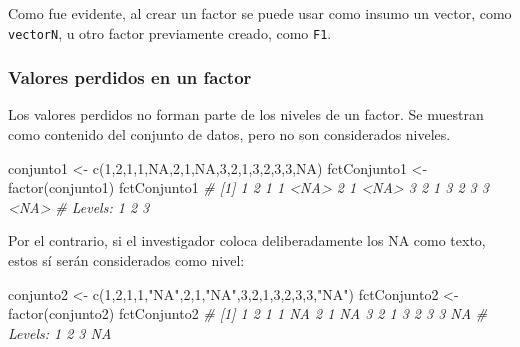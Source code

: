 \documentclass[
]{article}
\newenvironment{Shaded}{\begin{snugshade}}{\end{snugshade}}
\newcommand{\CommentTok}[1]{\textcolor[rgb]{0.56,0.35,0.01}{\textit{#1}}}
\newcommand{\ConstantTok}[1]{\textcolor[rgb]{0.00,0.00,0.00}{#1}}
\newcommand{\DecValTok}[1]{\textcolor[rgb]{0.00,0.00,0.81}{#1}}
\newcommand{\FunctionTok}[1]{\textcolor[rgb]{0.00,0.00,0.00}{#1}}
\newcommand{\NormalTok}[1]{#1}
\newcommand{\OtherTok}[1]{\textcolor[rgb]{0.56,0.35,0.01}{#1}}
\newcommand{\StringTok}[1]{\textcolor[rgb]{0.31,0.60,0.02}{#1}}
\theoremstyle{definition}
\theoremstyle{definition}
\theoremstyle{definition}
\theoremstyle{definition}
\theoremstyle{remark}
\begin{document}
Como fue evidente, al crear un factor se puede usar como insumo un vector, como \texttt{vectorN}, u otro factor previamente creado, como \texttt{F1}.

\hypertarget{valores-perdidos-en-un-factor}{%
\subsubsection{Valores perdidos en un factor}\label{valores-perdidos-en-un-factor}}

Los valores perdidos no forman parte de los niveles de un factor. Se muestran como contenido del conjunto de datos, pero no son considerados niveles.

\begin{Shaded}
\begin{Highlighting}[]
\NormalTok{conjunto1 }\OtherTok{\textless{}{-}} \FunctionTok{c}\NormalTok{(}\DecValTok{1}\NormalTok{,}\DecValTok{2}\NormalTok{,}\DecValTok{1}\NormalTok{,}\DecValTok{1}\NormalTok{,}\ConstantTok{NA}\NormalTok{,}\DecValTok{2}\NormalTok{,}\DecValTok{1}\NormalTok{,}\ConstantTok{NA}\NormalTok{,}\DecValTok{3}\NormalTok{,}\DecValTok{2}\NormalTok{,}\DecValTok{1}\NormalTok{,}\DecValTok{3}\NormalTok{,}\DecValTok{2}\NormalTok{,}\DecValTok{3}\NormalTok{,}\DecValTok{3}\NormalTok{,}\ConstantTok{NA}\NormalTok{)}
\NormalTok{fctConjunto1 }\OtherTok{\textless{}{-}} \FunctionTok{factor}\NormalTok{(conjunto1)}
\NormalTok{fctConjunto1}
\CommentTok{\#  [1] 1    2    1    1    \textless{}NA\textgreater{} 2    1    \textless{}NA\textgreater{} 3    2    1    3    2    3    3    \textless{}NA\textgreater{}}
\CommentTok{\# Levels: 1 2 3}
\end{Highlighting}
\end{Shaded}

Por el contrario, si el investigador coloca deliberadamente los NA como texto, estos sí serán considerados como nivel:

\begin{Shaded}
\begin{Highlighting}[]
\NormalTok{conjunto2 }\OtherTok{\textless{}{-}} \FunctionTok{c}\NormalTok{(}\DecValTok{1}\NormalTok{,}\DecValTok{2}\NormalTok{,}\DecValTok{1}\NormalTok{,}\DecValTok{1}\NormalTok{,}\StringTok{"NA"}\NormalTok{,}\DecValTok{2}\NormalTok{,}\DecValTok{1}\NormalTok{,}\StringTok{"NA"}\NormalTok{,}\DecValTok{3}\NormalTok{,}\DecValTok{2}\NormalTok{,}\DecValTok{1}\NormalTok{,}\DecValTok{3}\NormalTok{,}\DecValTok{2}\NormalTok{,}\DecValTok{3}\NormalTok{,}\DecValTok{3}\NormalTok{,}\StringTok{"NA"}\NormalTok{)}
\NormalTok{fctConjunto2 }\OtherTok{\textless{}{-}} \FunctionTok{factor}\NormalTok{(conjunto2)}
\NormalTok{fctConjunto2}
\CommentTok{\#  [1] 1  2  1  1  NA 2  1  NA 3  2  1  3  2  3  3  NA}
\CommentTok{\# Levels: 1 2 3 NA}
\end{Highlighting}
\end{Shaded}
\end{document}
